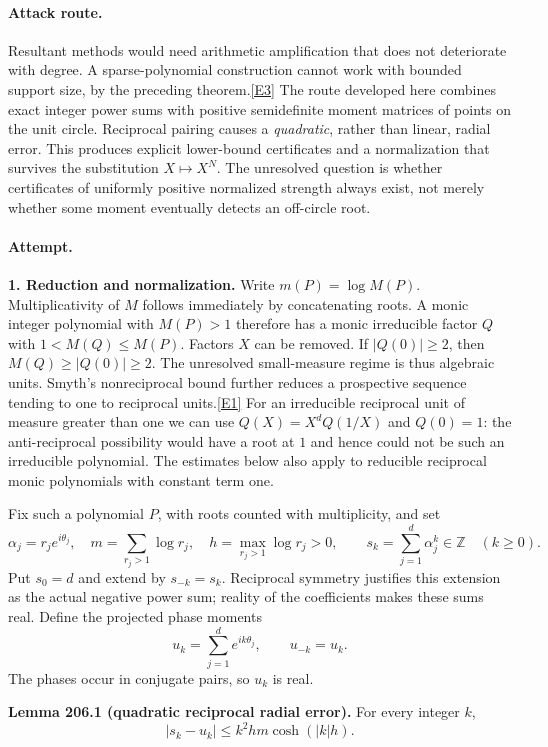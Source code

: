 \documentclass[11pt,a4paper]{article}
\newcommand{\Z}{\mathbb{Z}}
\newcommand{\eref}[2]{\hyperlink{extra:#1:#2}{[E#2]}}
\begin{document}
\paragraph{Attack route.}
Resultant methods would need arithmetic amplification that does not
deteriorate with degree. A sparse-polynomial construction cannot work
with bounded support size, by the preceding theorem.\eref{statement}{3}
The route developed here combines exact integer power sums with positive
semidefinite moment matrices of points on the unit circle. Reciprocal
pairing causes a \emph{quadratic}, rather than linear, radial error.
This produces explicit lower-bound certificates and a normalization
that survives the substitution $X\mapsto X^N$. The unresolved question
is whether certificates of uniformly positive normalized strength always
exist, not merely whether some moment eventually detects an off-circle
root.

\paragraph{Attempt.}
\textbf{1. Reduction and normalization.}
Write $m(P)=\log M(P)$. Multiplicativity of $M$ follows immediately by
concatenating roots. A monic integer polynomial with $M(P)>1$ therefore
has a monic irreducible factor $Q$ with $1<M(Q)\le M(P)$. Factors $X$
can be removed. If $|Q(0)|\ge2$, then
$M(Q)\ge|Q(0)|\ge2$. The unresolved small-measure regime is thus
algebraic units. Smyth's nonreciprocal bound further reduces a prospective
sequence tending to one to reciprocal units.\eref{statement}{1}
For an irreducible reciprocal unit of measure greater than one we can
use $Q(X)=X^dQ(1/X)$ and $Q(0)=1$: the anti-reciprocal possibility
would have a root at $1$ and hence could not be such an irreducible
polynomial. The estimates below also apply to reducible reciprocal
monic polynomials with constant term one.

Fix such a polynomial $P$, with roots counted with multiplicity, and set
\[
 \alpha_j=r_je^{i\theta_j},\quad
 m=\sum_{r_j>1}\log r_j,\quad
 h=\max_{r_j>1}\log r_j>0,
 \qquad
 s_k=\sum_{j=1}^d\alpha_j^k\in\Z\quad(k\ge0).
\]
Put $s_0=d$ and extend by $s_{-k}=s_k$. Reciprocal symmetry justifies
this extension as the actual negative power sum; reality of the
coefficients makes these sums real. Define the projected phase moments
\[
 u_k=\sum_{j=1}^de^{ik\theta_j},\qquad u_{-k}=u_k.
\]
The phases occur in conjugate pairs, so $u_k$ is real.

\textbf{Lemma 206.1 (quadratic reciprocal radial error).}
For every integer $k$,
\[
 |s_k-u_k|\le k^2 h m\cosh(|k|h). \tag{206.1}
\]
\end{document}
